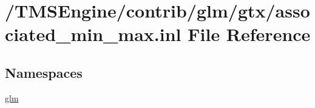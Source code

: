 \hypertarget{associated__min__max_8inl}{}\section{/\+T\+M\+S\+Engine/contrib/glm/gtx/associated\+\_\+min\+\_\+max.inl File Reference}
\label{associated__min__max_8inl}
\subsection*{Namespaces}
\begin{DoxyCompactItemize}
\item 
 \hyperlink{namespaceglm}{glm}
\end{DoxyCompactItemize}
